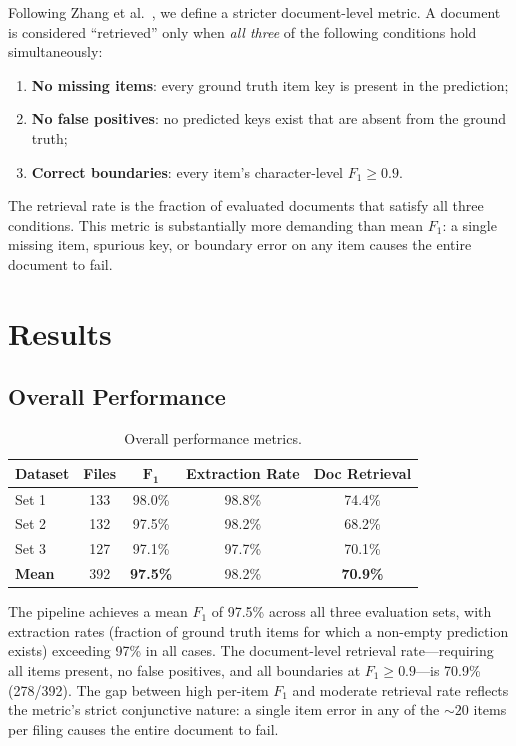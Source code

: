 \documentclass[12pt,letterpaper,oneside]{article}
\begin{document}
Following Zhang et al.~\cite{zhang2023form10k}, we define a stricter
document-level metric. A document is considered ``retrieved'' only
when \emph{all three} of the following conditions hold simultaneously:
\begin{enumerate}
  \item \textbf{No missing items}: every ground truth item key is
    present in the prediction;
  \item \textbf{No false positives}: no predicted keys exist that
    are absent from the ground truth;
  \item \textbf{Correct boundaries}: every item's character-level
    $F_1 \geq 0.9$.
\end{enumerate}
The retrieval rate is the fraction of evaluated documents that satisfy
all three conditions. This metric is substantially more demanding than
mean $F_1$: a single missing item, spurious key, or boundary error on
any item causes the entire document to fail.


\section{Results}\label{sec:results}

\subsection{Overall Performance}

\begin{table}[htbp]
\centering
\caption{Overall performance metrics.}\label{tab:results}
\begin{tabu}{lcccc}
\toprule
\textbf{Dataset} & \textbf{Files} & $\bm{F_1}$ & \textbf{Extraction Rate} & \textbf{Doc Retrieval} \\
\midrule
Set 1 & 133 & 98.0\% & 98.8\% & 74.4\% \\
Set 2 & 132 & 97.5\% & 98.2\% & 68.2\% \\
Set 3 & 127 & 97.1\% & 97.7\% & 70.1\% \\
\midrule
\textbf{Mean} & 392 & \textbf{97.5\%} & 98.2\% & \textbf{70.9\%} \\
\bottomrule
\end{tabu}
\end{table}

The pipeline achieves a mean $F_1$ of 97.5\% across all three
evaluation sets, with extraction rates (fraction of ground truth
items for which a non-empty prediction exists) exceeding 97\% in
all cases. The document-level retrieval rate---requiring all items
present, no false positives, and all boundaries at $F_1 \geq
0.9$---is 70.9\% (278/392). The gap between high per-item $F_1$
and moderate retrieval rate reflects the metric's strict
conjunctive nature: a single item error in any of the ${\sim}20$
items per filing causes the entire document to fail.
\end{document}
